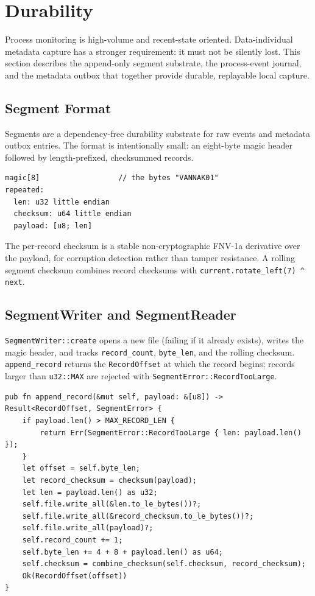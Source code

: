 \section{Durability}
\label{sec:durability}

Process monitoring is high-volume and recent-state oriented. Data-individual
metadata capture has a stronger requirement: it must not be silently lost. This
section describes the append-only segment substrate, the process-event journal,
and the metadata outbox that together provide durable, replayable local capture.

\subsection{Segment Format}

Segments are a dependency-free durability substrate for raw events and metadata
outbox entries. The format is intentionally small: an eight-byte magic header
followed by length-prefixed, checksummed records.

\begin{lstlisting}[numbers=none]
magic[8]                  // the bytes "VANNAK01"
repeated:
  len: u32 little endian
  checksum: u64 little endian
  payload: [u8; len]
\end{lstlisting}

The per-record checksum is a stable non-cryptographic FNV-1a derivative over the
payload, for corruption detection rather than tamper resistance. A rolling
segment checksum combines record checksums with
\texttt{current.rotate\_left(7) \^{} next}.

\subsection{SegmentWriter and SegmentReader}

\texttt{SegmentWriter::create} opens a new file (failing if it already exists),
writes the magic header, and tracks \texttt{record\_count}, \texttt{byte\_len},
and the rolling checksum. \texttt{append\_record} returns the
\texttt{RecordOffset} at which the record begins; records larger than
\texttt{u32::MAX} are rejected with \texttt{SegmentError::RecordTooLarge}.

\begin{lstlisting}
pub fn append_record(&mut self, payload: &[u8]) -> Result<RecordOffset, SegmentError> {
    if payload.len() > MAX_RECORD_LEN {
        return Err(SegmentError::RecordTooLarge { len: payload.len() });
    }
    let offset = self.byte_len;
    let record_checksum = checksum(payload);
    let len = payload.len() as u32;
    self.file.write_all(&len.to_le_bytes())?;
    self.file.write_all(&record_checksum.to_le_bytes())?;
    self.file.write_all(payload)?;
    self.record_count += 1;
    self.byte_len += 4 + 8 + payload.len() as u64;
    self.checksum = combine_checksum(self.checksum, record_checksum);
    Ok(RecordOffset(offset))
}
\end{lstlisting}

